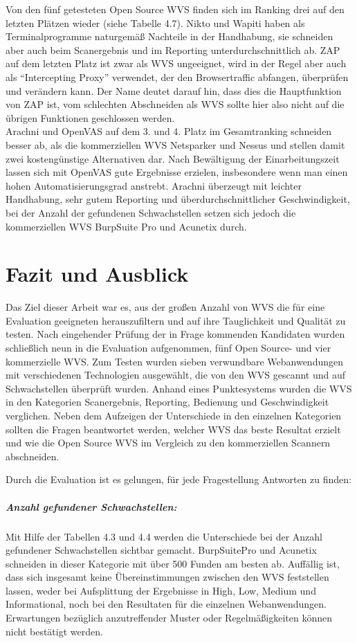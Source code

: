 \documentclass[12pt,oneside,a4paper,parskip,pointlessnumbers]{scrbook}
\begin{document}
  Von den fünf getesteten Open Source WVS finden sich im Ranking drei auf den letzten Plätzen wieder (siehe Tabelle 4.7). Nikto und Wapiti haben als Terminalprogramme naturgemäß Nachteile in der Handhabung, sie schneiden aber auch beim Scanergebnis und im Reporting unterdurchschnittlich ab. ZAP auf dem letzten Platz ist zwar als WVS ungeeignet, wird in der Regel aber auch als ``Intercepting Proxy'' verwendet, der den Browsertraffic abfangen, überprüfen und verändern kann. Der Name deutet darauf hin, dass dies die Hauptfunktion von ZAP ist, vom schlechten Abschneiden als WVS sollte hier also nicht auf die übrigen Funktionen geschlossen werden.\\
  Arachni und OpenVAS auf dem 3. und 4. Platz im Gesamtranking schneiden besser ab, als die kommerziellen WVS Netsparker und Nessus und stellen damit zwei kostengünstige Alternativen dar. Nach Bewältigung der Einarbeitungszeit lassen sich mit OpenVAS gute Ergebnisse erzielen, insbesondere wenn man einen hohen Automatisierungsgrad anstrebt.
  Arachni überzeugt mit leichter Handhabung, sehr gutem Reporting und überdurchschnittlicher Geschwindigkeit, bei der Anzahl der gefundenen Schwachstellen setzen sich jedoch die kommerziellen WVS BurpSuite Pro und Acunetix durch.


\chapter{Fazit und Ausblick}
Das Ziel dieser Arbeit war es, aus der großen Anzahl von WVS die für eine Evaluation geeigneten herauszufiltern und auf ihre Tauglichkeit und Qualität zu testen. Nach eingehender Prüfung der in Frage kommenden Kandidaten wurden schließlich neun in die Evaluation aufgenommen, fünf Open Source- und vier kommerzielle WVS.
Zum Testen wurden sieben verwundbare Webanwendungen mit verschiedenen Technologien ausgewählt, die von den WVS gescannt und auf Schwachstellen überprüft wurden. Anhand eines Punktesystems wurden die WVS in den Kategorien Scanergebnis, Reporting, Bedienung und Geschwindigkeit verglichen.
Neben dem Aufzeigen der Unterschiede in den einzelnen Kategorien sollten die Fragen beantwortet werden, welcher WVS das beste Resultat erzielt und wie die Open Source WVS im Vergleich zu den kommerziellen Scannern abschneiden.

Durch die Evaluation ist es gelungen, für jede Fragestellung Antworten zu finden:
\paragraph{Anzahl gefundener Schwachstellen:}
Mit Hilfe der Tabellen 4.3 und 4.4 werden die Unterschiede bei der Anzahl gefundener Schwachstellen sichtbar gemacht. BurpSuitePro und Acunetix schneiden in dieser Kategorie mit über 500 Funden am besten ab. Auffällig ist, dass sich insgesamt keine Übereinstimmungen zwischen den WVS feststellen lassen, weder bei Aufsplittung der Ergebnisse in High, Low, Medium und Informational, noch bei den Resultaten für die einzelnen Webanwendungen. Erwartungen bezüglich anzutreffender Muster oder Regelmäßigkeiten können nicht bestätigt werden.
\end{document}
